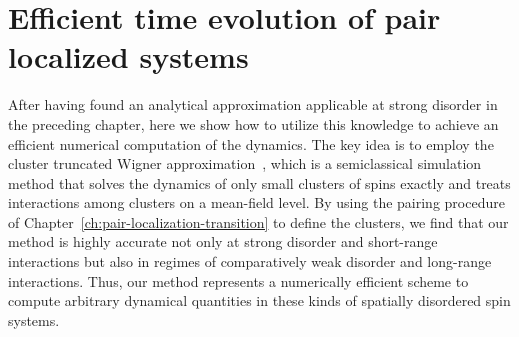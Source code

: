 \chapter{Efficient time evolution of pair localized systems}\label{ch:cTWA-paper}

After having found an analytical approximation applicable at strong disorder in the preceding chapter, here we show how to utilize this knowledge to achieve an efficient numerical computation of the dynamics. The key idea is to employ the cluster truncated Wigner approximation~\cite{wurtzClusterTruncatedWigner2018}, which is a semiclassical simulation method that solves the dynamics of only small clusters of spins exactly and treats interactions among clusters on a mean-field level. By using the pairing procedure of Chapter~\ref{ch:pair-localization-transition} to define the clusters, we find that our method is highly accurate not only at strong disorder and short-range interactions but also in regimes of comparatively weak disorder and long-range interactions. 
Thus, our method represents a numerically efficient scheme to compute arbitrary dynamical quantities in these kinds of spatially disordered spin systems.

\newpage
{}
